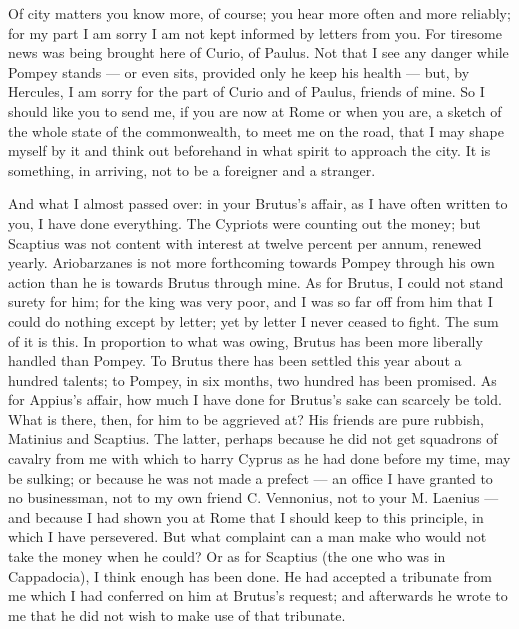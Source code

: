  Of city matters you know more, of course; you hear more often and more reliably; for my part I am sorry I am not kept informed by letters from you. For tiresome news was being brought here of Curio, of Paulus. Not that I see any danger while Pompey stands --- or even sits, provided only he keep his health --- but, by Hercules, I am sorry for the part of Curio and of Paulus, friends of mine. So I should like you to send me, if you are now at Rome or when you are, a sketch of the whole state of the commonwealth, to meet me on the road, that I may shape myself by it and think out beforehand in what spirit to approach the city. It is something, in arriving, not to be a foreigner and a stranger.

 And what I almost passed over: in your Brutus's affair, as I have often written to you, I have done everything. The Cypriots were counting out the money; but Scaptius was not content with interest at twelve percent per annum, renewed yearly. Ariobarzanes is not more forthcoming towards Pompey through his own action than he is towards Brutus through mine. As for Brutus, I could not stand surety for him; for the king was very poor, and I was so far off from him that I could do nothing except by letter; yet by letter I never ceased to fight. The sum of it is this. In proportion to what was owing, Brutus has been more liberally handled than Pompey. To Brutus there has been settled this year about a hundred talents; to Pompey, in six months, two hundred has been promised. As for Appius's affair, how much I have done for Brutus's sake can scarcely be told. What is there, then, for him to be aggrieved at? His friends are pure rubbish, Matinius and Scaptius. The latter, perhaps because he did not get squadrons of cavalry from me with which to harry Cyprus as he had done before my time, may be sulking; or because he was not made a prefect --- an office I have granted to no businessman, not to my own friend C. Vennonius, not to your M. Laenius --- and because I had shown you at Rome that I should keep to this principle, in which I have persevered. But what complaint can a man make who would not take the money when he could? Or as for Scaptius (the one who was in Cappadocia), I think enough has been done. He had accepted a tribunate from me which I had conferred on him at Brutus's request; and afterwards he wrote to me that he did not wish to make use of that tribunate.


